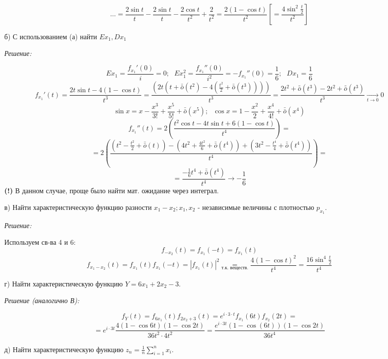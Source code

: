 \begin{exmp}
\begin{enumerate}
		\[ \dots = \frac{2 \sin t}{t} - \frac{2 \sin t}{t} - \frac{2 \cos t}{t^2} + \frac{2}{t^2} = \frac{2 (1 - \cos t)}{t^2} \left[ = \frac{4 \sin^2 \frac{t}{2}}{t^2} \right] \]
		
		\item[б)] С использованием (а) найти $Ex_1, Dx_1$
		
		\textit{Решение:}
		
		\[ Ex_1 = \frac{f_{x_1}' (0)}{i} = 0; ~~~ Ex_1^2 = \frac{f_{x_1}'' (0)}{i^2} = - f_{x_1}'' (0) = \frac{1}{6}; ~~~ Dx_1 = \frac{1}{6} \]
		\[ f_{x_1}' (t) = \frac{2 t \sin t - 4 (1 - \cos t)}{t^3} = \frac{( 2t ( t + \bar{\bar o} (t^2) - 4\left( \frac{t^2}{2} + \bar{\bar o} (t^3) \right) ) )}{t^3} = \frac{2t^2 + \bar{\bar o} (t^3) - 2t^2 + \bar{\bar o} (t^3)}{t^3} \underset{t \to 0}{\to} 0 \]
		\[ \sin x = x - \frac{x^3}{3!} + \frac{x^5}{5!} + \bar{\bar o} (x^5); ~~~ \cos x = 1 - \frac{x^2}{2} + \frac{x^4}{4!} + \bar{\bar o} (x^4) \]
		\[ f_{x_1}'' (t) = 2 \left( \frac{t^2 \cos t - 4 t \sin t + 6 (1 - \cos t)}{t^4} \right) = \]
		\[ = 2 \left( \frac{\left( t^2 - \frac{t^2}{2} + \bar{\bar o} (t) \right) - \left( 4t^2 + \frac{4t^2}{6} + \bar{\bar o} (t^4) \right) + \left( 3t^2 - \frac{t^4}{4} + \bar{\bar o} (t^4) \right)}{t^4} \right) = \]
		\[ = \frac{- \frac{1}{6} t^4 + \bar{\bar o} (t^4)}{t^4} \to - \frac{1}{6} \]
		\textbf{(!)} В данном случае, проще было найти мат. ожидание через интеграл.
		\item[в)] Найти характеристическую функцию разности $x_1 - x_2; x_1, x_2$ - независимые величины с плотностью $p_{x_1}$.
		
		\textit{Решение:}
		
		Используем св-ва 4 и 6:
		\[ f_{- x_2} (t) = f_{x_1} (-t) = f_{x_1} (t) \]
		\[ f_{x_1-x_2} (t) = f_{x_1} (t) f_{x_1} (-t) = |f_{x_1} (t)|^2 \underset{\text{т.к. веществ.}}{=} \frac{4 (1 - \cos t)^2}{t^4} = \frac{16 \sin^4 \frac{t}{2}}{t^4} \]
		
		\item[г)] Найти характеристическую функцию $Y = 6x_1 + 2x_2 - 3$.
		
		\textit{Решение (аналогично В):}
		
		\[ f_{Y} (t) = f_{6 x_1} (t) f_{2x_2 + 3} (t) = e^{i \cdot 3 \cdot t} f_{x_1} (6t) f_{x_2} (2t) = \]
		\[ = e^{i \cdot 3t} \frac{4 (1 - \cos 6t) (1 - \cos 2t)}{36 t^2 \cdot 4 t^2} = \frac{e^{i \cdot 3t} (1 - \cos (6t)) (1 - \cos 2t)}{36t^4} \]
		
		\item[д)] Найти характеристическую функцию $z_n = \frac{1}{n} \sum\limits_{i = 1}^{n} x_i$.
		

\end{enumerate}
\end{exmp}
